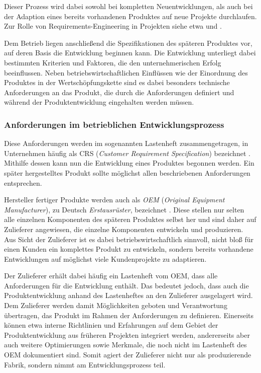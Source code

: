 \documentclass[12pt]{report}
\begin{document}
Dieser Prozess wird dabei sowohl bei kompletten Neuentwicklungen, als auch bei der Adaption eines bereits vorhandenen Produktes auf neue Projekte durchlaufen. Zur Rolle von Requirements-Engineering in Projekten siehe etwa \cite{mw02} und \cite{hl01}. 

Dem Betrieb liegen anschließend die Spezifikationen des späteren Produktes vor, auf deren Basis die Entwicklung beginnen kann. Die Entwicklung unterliegt dabei bestimmten Kriterien und Faktoren, die den unternehmerischen Erfolg beeinflussen. Neben betriebswirtschaftlichen Einflüssen wie der Einordnung des Produktes in der Wertschöpfungskette sind es dabei besonders technische Anforderungen an das Produkt, die durch die Anforderungen definiert und während der Produktentwicklung eingehalten werden müssen.

\subsubsection{Anforderungen im betrieblichen Entwicklungsprozess}
Diese Anforderungen werden im sogenannten Lastenheft zusammengetragen, in Unternehmen häufig als CRS (\textit{Customer Requirement Specification}) bezeichnet \cite{dge19}. Mithilfe dessen kann nun die Entwicklung eines Produktes begonnen werden. Ein später hergestelltes Produkt sollte möglichst allen beschriebenen Anforderungen entsprechen. 

Hersteller fertiger Produkte werden auch als \textit{OEM} (\textit{Original Equipment Manufacturer}), zu Deutsch \textit{Erstausrüster}, bezeichnet \cite{ir09}. Diese stellen nur selten alle einzelnen Komponenten des späteren Produktes selbst her und sind daher auf Zulieferer angewiesen, die einzelne Komponenten entwickeln und produzieren. Aus Sicht der Zulieferer ist es dabei betriebswirtschaftlich sinnvoll, nicht bloß für einen Kunden ein komplettes Produkt zu entwickeln, sondern bereits vorhandene Entwicklungen auf möglichst viele Kundenprojekte zu adaptieren. 

Der Zulieferer erhält dabei häufig ein Lastenheft vom OEM, dass alle Anforderungen für die Entwicklung enthält. Das bedeutet jedoch, dass auch die Produktentwicklung anhand des Lastenheftes an den Zulieferer ausgelagert wird. Dem Zulieferer werden damit Möglichkeiten geboten und Verantwortung übertragen, das Produkt im Rahmen der Anforderungen zu definieren. Einerseits können etwa interne Richtlinien und Erfahrungen auf dem Gebiet der Produktentwicklung aus früheren Projekten integriert werden, andererseits aber auch weitere Optimierungen sowie Merkmale, die noch nicht im Lastenheft des OEM dokumentiert sind. Somit agiert der Zulieferer nicht nur als produzierende Fabrik, sondern nimmt am Entwicklungsprozess teil.
\end{document}
